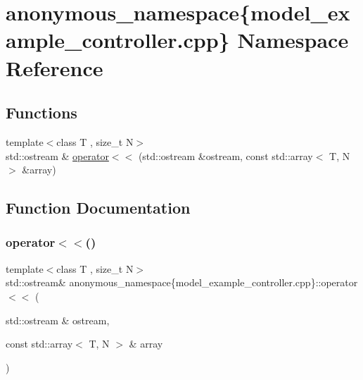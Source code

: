 \hypertarget{namespaceanonymous__namespace_02model__example__controller_8cpp_03}{}\section{anonymous\+\_\+namespace\{model\+\_\+example\+\_\+controller.\+cpp\} Namespace Reference}
\label{namespaceanonymous__namespace_02model__example__controller_8cpp_03}
\subsection*{Functions}
\begin{DoxyCompactItemize}
\item 
{\footnotesize template$<$class T , size\+\_\+t N$>$ }\\std\+::ostream \& \hyperlink{namespaceanonymous__namespace_02model__example__controller_8cpp_03_a1973f45ec2976cf79fc969a0d6c6b0dc}{operator$<$$<$} (std\+::ostream \&ostream, const std\+::array$<$ T, N $>$ \&array)
\end{DoxyCompactItemize}


\subsection{Function Documentation}
\mbox{\label{namespaceanonymous__namespace_02model__example__controller_8cpp_03_a1973f45ec2976cf79fc969a0d6c6b0dc}} 
\subsubsection{\texorpdfstring{operator$<$$<$()}{operator<<()}}
{\footnotesize\ttfamily template$<$class T , size\+\_\+t N$>$ \\
std\+::ostream\& anonymous\+\_\+namespace\{model\+\_\+example\+\_\+controller.\+cpp\}\+::operator$<$$<$ (\begin{DoxyParamCaption}\item[{std\+::ostream \&}]{ostream,  }\item[{const std\+::array$<$ T, N $>$ \&}]{array }\end{DoxyParamCaption})}




